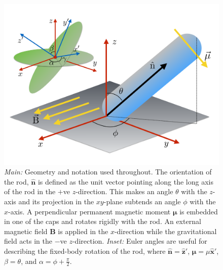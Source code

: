 \documentclass[aps,prl,superscriptaddress]{revtex4-1}
\newcommand{\vcrm}[1]{\mathbf{#1}}
\newcommand{\hvcrm}[1]{\mathbf{\hat{#1}}}
\newcommand{\vc}[1]{\boldsymbol{#1}}
\begin{document}
\begin{figure}
		\includegraphics[width=0.98\columnwidth]{figs/geometry.pdf}
	\caption{\footnotesize \emph{Main:} Geometry and notation used throughout. The orientation of the rod, $\hvcrm{n}$ is defined as the unit vector pointing along the long axis of the rod in the $+$ve $z$-direction. This makes an angle $\theta$ with the $z$-axis and its projection in the $xy$-plane subtends an angle $\phi$ with the $x$-axis. A perpendicular permanent magnetic moment $\vc{\mu}$ is embedded in one of the caps and rotates rigidly with the rod. An external magnetic field $\vcrm{B}$ is applied in the $x$-direction while the gravitational field acts in the $-$ve $z$-direction. \emph{Inset:} Euler angles are useful for describing the fixed-body rotation of the rod, where $\hvcrm{n}=\hvcrm{z}'$, $\vc{\mu}=\mu\hvcrm{x}'$, $\beta=\theta$, and $\alpha=\phi+\frac{\pi}{2}$.\label{fig:geometry}}
\end{figure}
\end{document}
